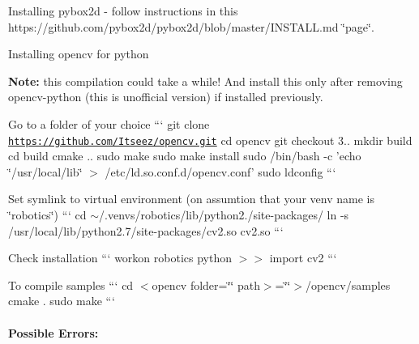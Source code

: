 \begin{DoxyEnumerate}
\item Installing pybox2d -\/ follow instructions in this https\-://github.com/pybox2d/pybox2d/blob/master/\-I\-N\-S\-T\-A\-L\-L.\-md \char`\"{}page\char`\"{}.
\item Installing opencv for python

{\bfseries Note\-:} this compilation could take a while! And install this only after removing opencv-\/python (this is unofficial version) if installed previously.
\begin{DoxyItemize}
\item Go to a folder of your choice ``` git clone \href{https://github.com/Itseez/opencv.git}{\tt https\-://github.\-com/\-Itseez/opencv.\-git} cd opencv git checkout 3.. mkdir build cd build cmake .. sudo make sudo make install sudo /bin/bash -\/c 'echo \char`\"{}/usr/local/lib\char`\"{} $>$ /etc/ld.so.\-conf.\-d/opencv.conf' sudo ldconfig ```
\item Set symlink to virtual environment (on assumtion that your venv name is \char`\"{}robotics\char`\"{}) ``` cd $\sim$/.venvs/robotics/lib/python2./site-\/packages/ ln -\/s /usr/local/lib/python2.7/site-\/packages/cv2.\-so cv2.\-so ```
\item Check installation ``` workon robotics python $>$$>$ import cv2 ```
\item To compile samples ``` cd $<$opencv folder=\char`\"{}\char`\"{} path$>$=\char`\"{}\char`\"{}$>$/opencv/samples cmake . sudo make ```
\end{DoxyItemize}
\end{DoxyEnumerate}

\paragraph*{Possible Errors\-:}


